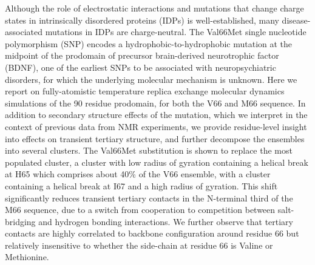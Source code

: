\documentclass[10pt,letterpaper]{article}
\begin{document}
Although the role of electrostatic interactions and mutations that change charge states in intrinsically disordered proteins (IDPs) is well-established, many disease-associated mutations in IDPs are charge-neutral. The Val66Met single nucleotide polymorphism (SNP) encodes a hydrophobic-to-hydrophobic mutation at the midpoint of the prodomain of precursor brain-derived neurotrophic factor (BDNF), one of the earliest SNPs to be associated with neuropsychiatric disorders, for which the underlying molecular mechanism is unknown. Here we report on fully-atomistic temperature replica exchange molecular dynamics simulations of the 90 residue prodomain, for both the V66 and M66 sequence. In addition to secondary structure effects of the mutation, which we interpret in the context of previous data from NMR experiments, we provide residue-level insight into effects on transient tertiary structure, and further decompose the ensembles into several clusters. The Val66Met substitution is shown to replace the most populated cluster, a cluster with low radius of gyration containing a helical break at H65 which comprises about 40\% of the V66 ensemble, with a cluster containing a helical break at I67 and a high radius of gyration. This shift significantly reduces transient tertiary contacts in the N-terminal third of the M66 sequence, due to a switch from cooperation to competition between salt-bridging and hydrogen bonding interactions. We further observe that tertiary contacts are highly correlated to backbone configuration around residue 66 but relatively insensitive to whether the side-chain at residue 66 is Valine or Methionine. %
\end{document}
